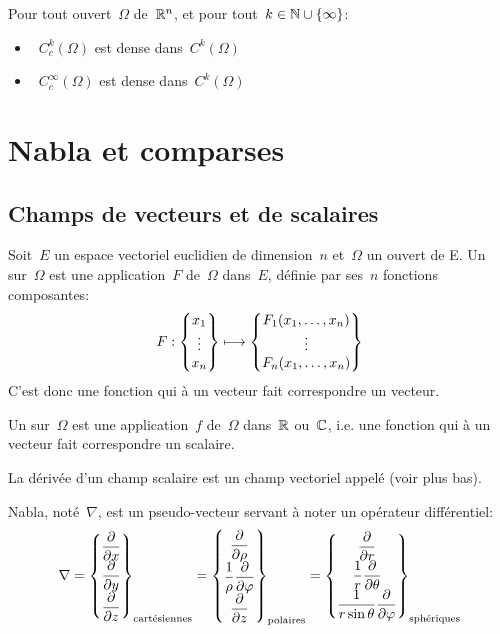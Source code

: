 Pour tout ouvert~$\Omega$ de~$\mathbb R^n$, et pour tout~$k\in\mathbb N\cup\{\infty\}$:
\begin{itemize}
  \item~$C_c^k(\Omega)$ est dense dans~$C^k(\Omega)$
  \item~$C_c^\infty(\Omega)$ est dense dans~$C^k(\Omega)$
\end{itemize}

\medskip
\section{Nabla et comparses}
\subsection{Champs de vecteurs et de scalaires}
\begin{definition}
Soit~$E$ un espace vectoriel euclidien
de dimension~$n$ et~$\Omega$ un ouvert de E.
Un  sur~$\Omega$ est une application~$F$ de~$\Omega$ dans~$E$,
définie par ses~$n$ fonctions composantes:
\begin{equation}
  F: \VV*{x_1\\\vdots\\x_n} \longmapsto \VV*{F_1(x_1,\dots,x_n)\\ \vdots\\ F_n(x_1,\dots,x_n)}
\end{equation}
C'est donc une fonction qui à un vecteur fait correspondre un vecteur.
\end{definition}
\medskip
\begin{definition}
Un  sur~$\Omega$ est une application~$f$ de~$\Omega$ dans~$\mathbb R$ ou~$\mathbb C$,
i.e. une fonction qui à un vecteur fait correspondre un scalaire.
\end{definition}
La dérivée d'un champ scalaire est un champ vectoriel appelé  (voir plus bas).

\medskip
{} Nabla, noté~$\nabla$, est un pseudo-vecteur  servant à noter un opérateur
différentiel:
\begin{equation}
\nabla = \VV*{{\dfrac\partial{\partial x}}\\ \dfrac\partial{\partial y}\\ \dfrac\partial{\partial z}}_{\text{cartésiennes}}
= \VV*{\dfrac\partial{\partial \rho}\\ \dfrac1\rho \dfrac\partial{\partial \varphi}\\ \dfrac\partial{\partial z}}_{\text{polaires}}
= \VV*{\dfrac\partial{\partial r}\\ \dfrac1r \dfrac\partial{\partial \theta}\\\dfrac1{r\sin\theta} \dfrac\partial{\partial \varphi}}_{\text{sphériques}}
\end{equation}

